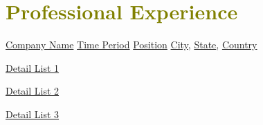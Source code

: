 
\section{\textcolor{olive}{\textbf{Professional Experience}}}
    \resumeSubHeadingListStart
    
    \resumeSubheading
        {\underline{Company Name}}
        {\underline{Time Period}}
        {\underline{Position}}
        {\textcolor{gray}{\footnotesize{\faMapMarker}} \underline{City}, \underline{State}, \underline{Country}}

        \resumeItemListStart
            \item \underline{Detail List 1}
            \item \underline{Detail List 2}
            \item \underline{Detail List 3}
        \resumeItemListEnd


    \resumeSubHeadingListEnd